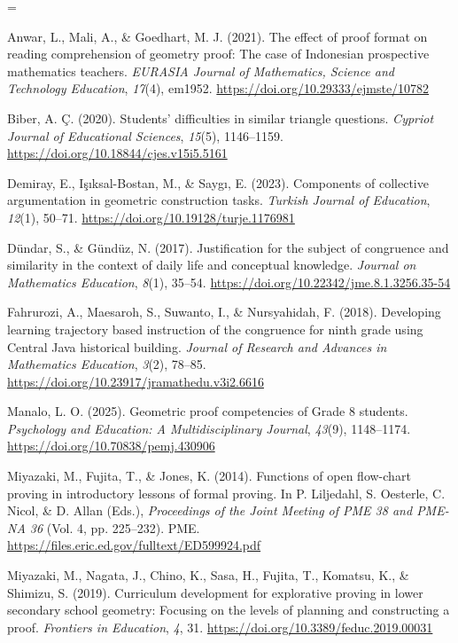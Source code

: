 \documentclass[a4paper,12pt]{article}
\begin{document}
{\TimesEn\linespread{1.0}\selectfont\fontsize{11.5pt}{17.8pt}\selectfont
\setlength{\parskip}{5.5pt}
\everypar={\hangindent=0.85cm }

Anwar, L., Mali, A., \& Goedhart, M. J. (2021). The effect of proof format on reading comprehension of geometry proof: The case of Indonesian prospective mathematics teachers. \textit{EURASIA Journal of Mathematics, Science and Technology Education}, \textit{17}(4), em1952. \url{https://doi.org/10.29333/ejmste/10782}

Biber, A. \c{C}. (2020). Students' difficulties in similar triangle questions. \textit{Cypriot Journal of Educational Sciences}, \textit{15}(5), 1146--1159. \url{https://doi.org/10.18844/cjes.v15i5.5161}

Demiray, E., I\c{s}\i ksal-Bostan, M., \& Sayg\i, E. (2023). Components of collective argumentation in geometric construction tasks. \textit{Turkish Journal of Education}, \textit{12}(1), 50--71. \url{https://doi.org/10.19128/turje.1176981}

Dündar, S., \& Gündüz, N. (2017). Justification for the subject of congruence and similarity in the context of daily life and conceptual knowledge. \textit{Journal on Mathematics Education}, \textit{8}(1), 35--54. \url{https://doi.org/10.22342/jme.8.1.3256.35-54}

Fahrurozi, A., Maesaroh, S., Suwanto, I., \& Nursyahidah, F. (2018). Developing learning trajectory based instruction of the congruence for ninth grade using Central Java historical building. \textit{Journal of Research and Advances in Mathematics Education}, \textit{3}(2), 78--85. \url{https://doi.org/10.23917/jramathedu.v3i2.6616}

Manalo, L. O. (2025). Geometric proof competencies of Grade 8 students. \textit{Psychology and Education: A Multidisciplinary Journal}, \textit{43}(9), 1148--1174. \url{https://doi.org/10.70838/pemj.430906}

Miyazaki, M., Fujita, T., \& Jones, K. (2014). Functions of open flow-chart proving in introductory lessons of formal proving. In P. Liljedahl, S. Oesterle, C. Nicol, \& D. Allan (Eds.), \textit{Proceedings of the Joint Meeting of PME 38 and PME-NA 36} (Vol. 4, pp. 225--232). PME. \url{https://files.eric.ed.gov/fulltext/ED599924.pdf}

Miyazaki, M., Nagata, J., Chino, K., Sasa, H., Fujita, T., Komatsu, K., \& Shimizu, S. (2019). Curriculum development for explorative proving in lower secondary school geometry: Focusing on the levels of planning and constructing a proof. \textit{Frontiers in Education}, \textit{4}, 31. \url{https://doi.org/10.3389/feduc.2019.00031}

}
\end{document}
